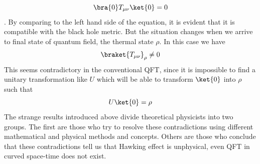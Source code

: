 \documentclass[12pt,a4paper]{article}
\begin{document}
\begin{equation}\label{eqn.vacuum2}
\bra{0}T_{\mu\nu}\ket{0}=0
\end{equation}.
By comparing to the left hand side of the equation, it is evident that it is compatible with the black hole metric. But the situation changes when we arrive to final state of quantum field, the thermal state $\rho$.
In this case we have
\begin{equation}\label{eqn.thermal}
\braket{T_{\mu\nu}}_{\rho}\neq 0
\end{equation}
This seems contradictory in the conventional QFT, since it is impossible to find a unitary transformation like $U$ which will be able to transform $\ket{0}$ into $\rho$ such that
\begin{equation}\label{eqn.vacuum to thermal}
U\ket{0}=\rho
\end{equation}
The strange results introduced above divide theoretical physicists into two groups. The first are those who try to resolve these contradictions using different mathematical and physical methods and concepts. Others are those who conclude that these contradictions tell us that Hawking effect is unphysical, even QFT in curved space-time does not exist.
\end{document}
